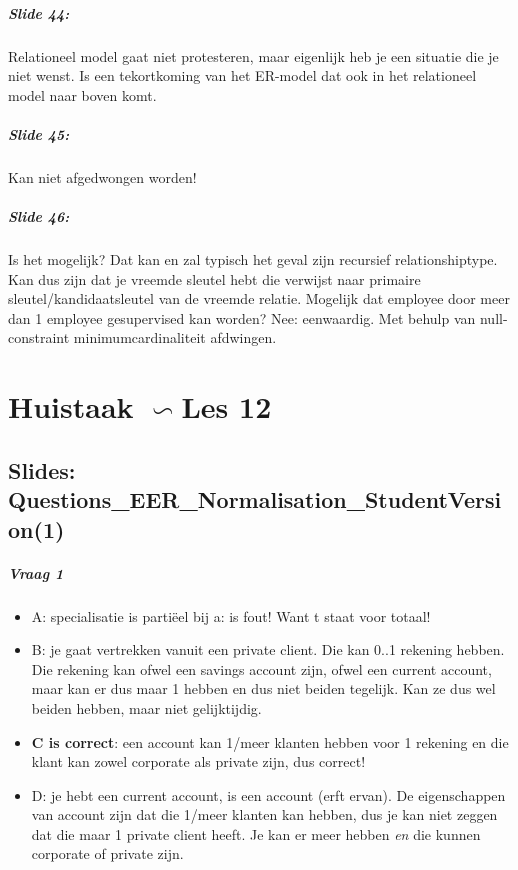 \documentclass[10pt,a4paper]{report}
\begin{document}
\paragraph{Slide 44:}Relationeel model gaat niet protesteren, maar eigenlijk heb je een situatie die je niet wenst. Is een tekortkoming van het ER-model dat ook in het relationeel model naar boven komt.

\paragraph{Slide 45:}Kan niet afgedwongen worden!

\paragraph{Slide 46:}Is het mogelijk? Dat kan en zal typisch het geval zijn recursief relationshiptype. Kan dus zijn dat je vreemde sleutel hebt die verwijst naar primaire sleutel/kandidaatsleutel van de vreemde relatie.
Mogelijk dat employee door meer dan 1 employee gesupervised kan worden? Nee: eenwaardig.
Met behulp van null-constraint minimumcardinaliteit afdwingen.

\chapter{Huistaak $\backsim$Les 12}
\section{Slides: Questions\_EER\_Normalisation\_StudentVersion(1)}

\paragraph{Vraag 1}
\begin{itemize}
\item A: specialisatie is parti\"eel bij a: is fout! Want t staat voor totaal!
\item B: je gaat vertrekken vanuit een private client. Die kan 0..1 rekening hebben. Die rekening kan ofwel een savings account zijn, ofwel een current account, maar kan er dus maar 1 hebben en dus niet beiden tegelijk. Kan ze dus wel beiden hebben, maar niet gelijktijdig.
\item \textbf{C is correct}: een account kan 1/meer klanten hebben voor 1 rekening en die klant kan zowel corporate als private zijn, dus correct!
\item D: je hebt een current account, is een account (erft ervan). De eigenschappen van account zijn dat die 1/meer klanten kan hebben, dus je kan niet zeggen dat die maar 1 private client heeft. Je kan er meer hebben \emph{en} die kunnen corporate of private zijn.
\end{itemize}
\end{document}
